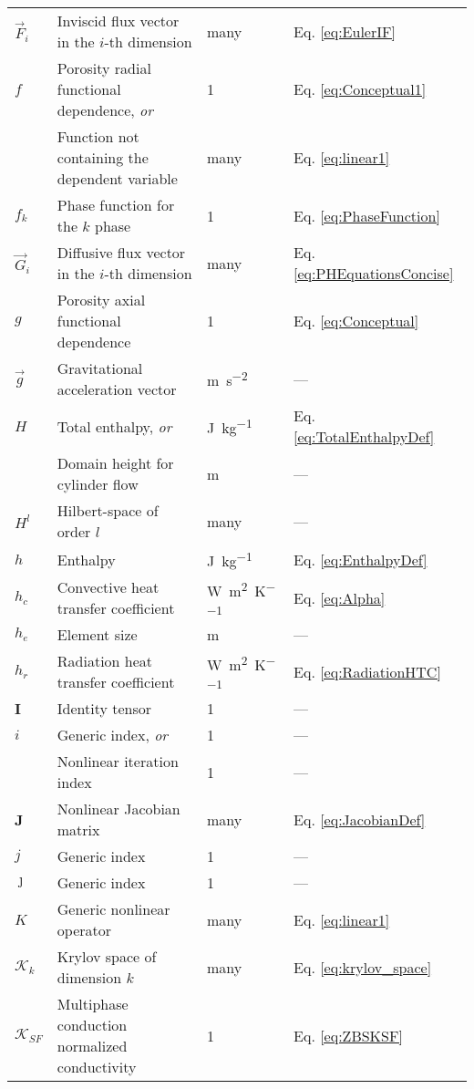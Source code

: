 \begin{longtable}{p{2cm}p{9cm}p{2cm}p{5cm}}
\(\vec{F}_i\) & Inviscid flux vector in the \(i\)-th dimension & many & Eq. \eqref{eq:EulerIF}\\
\(f\) & Porosity radial functional dependence, \textit{or} & 1 & Eq. \eqref{eq:Conceptual1}\\
& Function not containing the dependent variable & many & Eq. \eqref{eq:linear1}\\
\(f_k\) & Phase function for the \(k\) phase & 1 & Eq. \eqref{eq:PhaseFunction}\\
\(\vec{G}_i\) & Diffusive flux vector in the \(i\)-th dimension & many & Eq. \eqref{eq:PHEquationsConcise}\\
\(g\) & Porosity axial functional dependence & 1 & Eq. \eqref{eq:Conceptual}\\
\(\vec{g}\) & Gravitational acceleration vector & \si{\meter\per\square\second} & ---\\
\(H\) & Total enthalpy, \textit{or} & \si{\joule\per\kilo\gram} & Eq. \eqref{eq:TotalEnthalpyDef}\\
& Domain height for cylinder flow & \si{\meter} & ---\\
\(H^l\) & Hilbert-space of order \(l\) & many & ---\\
\(h\) & Enthalpy & \si{\joule\per\kilo\gram} & Eq. \eqref{eq:EnthalpyDef}\\
\(h_c\) & Convective heat transfer coefficient & \si{\watt\per\square\meter\per\kelvin} & Eq. \eqref{eq:Alpha}\\
\(h_e\) & Element size & \si{\meter} & ---\\
\(h_r\) & Radiation heat transfer coefficient & \si{\watt\per\square\meter\per\kelvin} & Eq. \eqref{eq:RadiationHTC}\\
\(\textbf{I}\) & Identity tensor & 1 & ---\\
\(i\) & Generic index, \textit{or} & 1 & ---\\
& Nonlinear iteration index & 1 & ---\\
\textbf{J} & Nonlinear Jacobian matrix & many & Eq. \eqref{eq:JacobianDef}\\
\(j\) & Generic index & 1 & ---\\
\(\jmath\) & Generic index & 1 & ---\\
\(K\) & Generic nonlinear operator & many & Eq. \eqref{eq:linear1}\\
\(\mathcal{K}_k\) & Krylov space of dimension \(k\) & many & Eq. \eqref{eq:krylov_space}\\
\(\mathscr{K}_{SF}\) & Multiphase conduction normalized conductivity & 1 & Eq. \eqref{eq:ZBSKSF}\\

\end{longtable}
